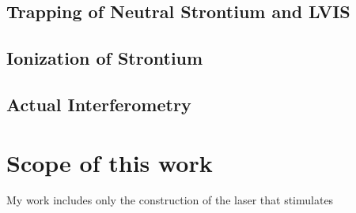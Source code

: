 \subsection{Trapping of Neutral Strontium and LVIS}



\subsection{Ionization of Strontium}

\subsection{Actual Interferometry}

\section{Scope of this work}
My work includes only the construction of the laser that stimulates